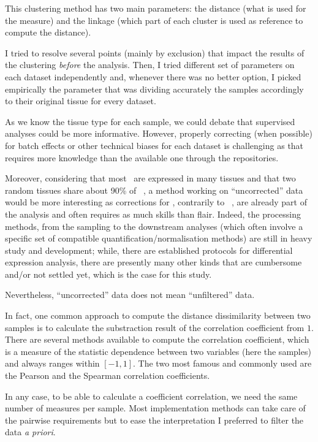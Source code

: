 This clustering method has two main parameters:
the distance (what is used for the measure)
and the linkage (which part of each cluster is used as reference to compute the
distance).

I tried to resolve several points (mainly by exclusion)
that impact the results of the clustering \emph{before} the analysis.
Then, I tried different set of
parameters on each dataset independently and, whenever there was no better
option, I picked empirically the parameter that was dividing accurately
the samples accordingly to their original tissue for every dataset.

As we know the tissue type for each sample, we could debate that supervised
analyses could be more informative. However, properly correcting (when possible)
for batch effects or other technical biases for each dataset is
challenging as that requires more knowledge than the available one
through the repositories.

Moreover, considering that most \mRNAs\ are expressed in many tissues
and that two random tissues share about 90\% of \mRNAs\ \citep{ramskoldan:2009},
a method working on ``uncorrected'' data would be more interesting as
corrections for \Rnaseq{}, contrarily to \Dnaseq\ \TKR,
are already part of the analysis 
and often requires as much skills than flair. Indeed, the processing methods,
from the sampling to the downstream analyses (which often involve
a specific set of compatible quantification/normalisation methods) are still
in heavy study and development; while, there are established protocols for
differential expression analysis, there are presently many other kinds
that are cumbersome and/or not settled yet, which is the case for this study.

Nevertheless, ``uncorrected'' data does not mean ``unfiltered'' data.

In fact, one common approach to compute the distance dissimilarity
between two samples is to calculate the substraction result of
the correlation coefficient from $1$.
There are several methods available to compute the correlation coefficient,
which is a measure of the statistic dependence between two variables
(here the samples) and always ranges within $[-1,1]$.
The two most famous and commonly used are the Pearson and the Spearman correlation
coefficients.

In any case, to be able to calculate a coefficient correlation, we need the same
number of measures per sample. Most implementation methods can take care of the
pairwise requirements but to ease the interpretation I preferred to filter the
data \textit{a priori}.


